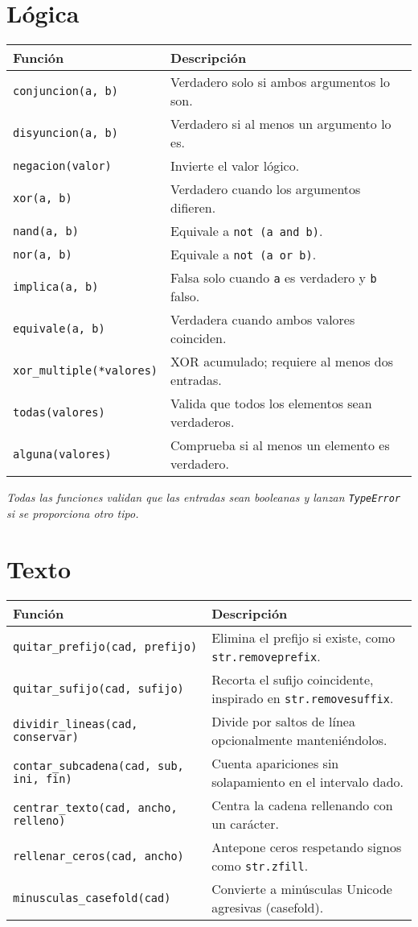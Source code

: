 \documentclass{article}
\begin{document}
\section*{Lógica}
\begin{tabular}{ll}
\textbf{Función} & \textbf{Descripción}\\\hline
\texttt{conjuncion(a, b)} & Verdadero solo si ambos argumentos lo son.\\
\texttt{disyuncion(a, b)} & Verdadero si al menos un argumento lo es.\\
\texttt{negacion(valor)} & Invierte el valor lógico.\\
\texttt{xor(a, b)} & Verdadero cuando los argumentos difieren.\\
\texttt{nand(a, b)} & Equivale a \texttt{not (a and b)}.\\
\texttt{nor(a, b)} & Equivale a \texttt{not (a or b)}.\\
\texttt{implica(a, b)} & Falsa solo cuando \texttt{a} es verdadero y \texttt{b} falso.\\
\texttt{equivale(a, b)} & Verdadera cuando ambos valores coinciden.\\
\texttt{xor\_multiple(*valores)} & XOR acumulado; requiere al menos dos entradas.\\
\texttt{todas(valores)} & Valida que todos los elementos sean verdaderos.\\
\texttt{alguna(valores)} & Comprueba si al menos un elemento es verdadero.\\
\end{tabular}

\textit{Todas las funciones validan que las entradas sean booleanas y lanzan \texttt{TypeError} si se proporciona otro tipo.}

\section*{Texto}
\begin{tabular}{ll}
\textbf{Función} & \textbf{Descripción}\\\hline
\texttt{quitar\_prefijo(cad, prefijo)} & Elimina el prefijo si existe, como \texttt{str.removeprefix}.\\
\texttt{quitar\_sufijo(cad, sufijo)} & Recorta el sufijo coincidente, inspirado en \texttt{str.removesuffix}.\\
\texttt{dividir\_lineas(cad, conservar)} & Divide por saltos de línea opcionalmente manteniéndolos.\\
\texttt{contar\_subcadena(cad, sub, ini, fin)} & Cuenta apariciones sin solapamiento en el intervalo dado.\\
\texttt{centrar\_texto(cad, ancho, relleno)} & Centra la cadena rellenando con un carácter.\\
\texttt{rellenar\_ceros(cad, ancho)} & Antepone ceros respetando signos como \texttt{str.zfill}.\\
\texttt{minusculas\_casefold(cad)} & Convierte a minúsculas Unicode agresivas (casefold).\\
\end{tabular}
\end{document}
